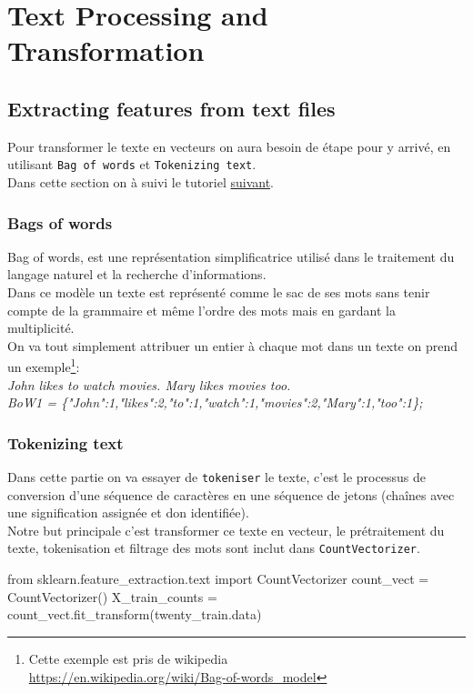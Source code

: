 \documentclass[english,a4paper,11pt,oneside]{article}
\begin{document}
	\section{Text Processing and Transformation}{
		\subsection{Extracting features from text files}{
			Pour transformer le texte en vecteurs on aura besoin de étape pour y arrivé, en utilisant \texttt{Bag of words} et \texttt{Tokenizing text}.\\
			Dans cette section on à suivi le tutoriel \href{https://scikit-learn.org/stable/tutorial/text_analytics/working_with_text_data.html#tutorial-setup}{suivant}.
			\subsubsection{Bags of words}{
				Bag of words, est une représentation simplificatrice utilisé dans le traitement du langage naturel et la recherche d'informations.\\
				Dans ce modèle un texte est représenté comme le sac de ses mots sans tenir compte de la grammaire et même l'ordre des mots mais en gardant la multiplicité.\\
				On va tout simplement attribuer un entier à chaque mot dans un texte on prend un exemple\footnote{Cette exemple est pris de wikipedia \\ \url{https://en.wikipedia.org/wiki/Bag-of-words_model}}: \\
				\itshape{John likes to watch movies. Mary likes movies too.}\\
				\itshape{BoW1 = \{"John":1,"likes":2,"to":1,"watch":1,"movies":2,"Mary":1,"too":1\};}
			}
			\newpage
			\subsubsection{Tokenizing text}{
				Dans cette partie on va essayer de \texttt{tokeniser} le texte, c'est le processus de conversion d'une séquence de caractères en une séquence de jetons (chaînes avec une signification assignée et don identifiée).\\
				Notre but principale c'est transformer ce texte en vecteur, le prétraitement du texte, tokenisation et filtrage des mots sont inclut dans \texttt{CountVectorizer}.\\
				\begin{pythonn}
from sklearn.feature_extraction.text import CountVectorizer
count_vect = CountVectorizer()
X_train_counts = count_vect.fit_transform(twenty_train.data)
				\end{pythonn}
			
}}}
\end{document}

